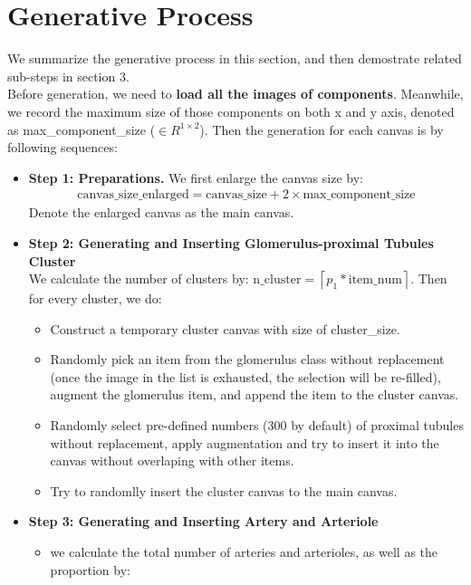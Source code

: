 \documentclass{article}
\begin{document}
\section{Generative Process}
We summarize the generative process in this section, and then demostrate related sub-steps in section 3. \\
Before generation, we need to \textbf{load all the images of components}. Meanwhile, we record the maximum size of those components on both x and y axis, denoted as max\_component\_size ($\in R^{1\times2}$). 
Then the generation for each canvas is by following sequences:
\begin{itemize}
	\item \textbf{Step 1: Preparations.} 
	We first enlarge the canvas size by:
	\begin{align*}
		\text{canvas\_size\_enlarged} = \text{canvas\_size} + 2\times \text{max\_component\_size}
	\end{align*}
	Denote the enlarged canvas as the main canvas.
	\item \textbf{Step 2: Generating and Inserting Glomerulus-proximal Tubules Cluster} \\
We calculate the number of clusters by: $\text{n\_cluster} = \left \lceil{p_1*  \text{item\_num} }\right \rceil$. Then for every cluster, we do:
	\begin{itemize}
			\item Construct a temporary cluster canvas with size of cluster\_size.
			\item Randomly pick an item from the glomerulus class without replacement (once the image in the list is exhausted, the selection will be re-filled), augment the glomerulus item, and append the item to the cluster canvas. 
			\item Randomly select pre-defined numbers (300 by default) of proximal tubules without replacement, apply augmentation and try to insert it into the canvas without overlaping with other items.
			\item Try to randomlly insert the cluster canvas to the main canvas.
\end{itemize}
	\item \textbf{Step 3: Generating and Inserting Artery and Arteriole}\\
	\begin{itemize}
		\item we calculate the total number of arteries and arterioles, as well as the proportion by:\\
		\begin{align*}

\end{align*}
\end{itemize}
\end{itemize}
\end{document}
